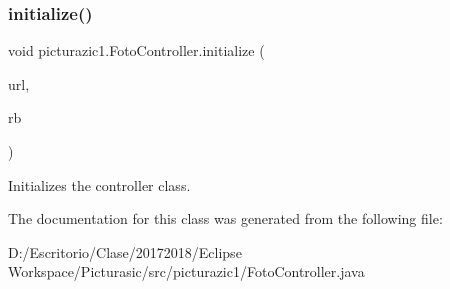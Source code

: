 \subsubsection{\texorpdfstring{initialize()}{initialize()}}
{\footnotesize\ttfamily void picturazic1.\+Foto\+Controller.\+initialize (\begin{DoxyParamCaption}\item[{U\+RL}]{url,  }\item[{Resource\+Bundle}]{rb }\end{DoxyParamCaption})}

Initializes the controller class. 

The documentation for this class was generated from the following file\+:\begin{DoxyCompactItemize}
\item 
D\+:/\+Escritorio/\+Clase/20172018/\+Eclipse Workspace/\+Picturasic/src/picturazic1/Foto\+Controller.\+java\end{DoxyCompactItemize}
